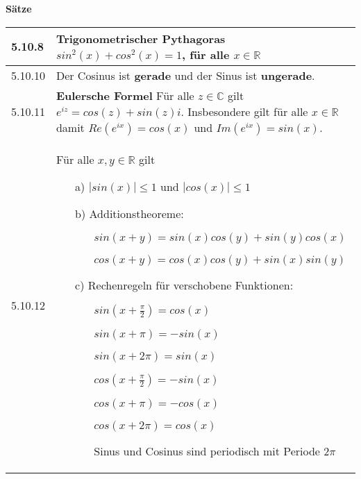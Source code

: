     \noindent 
    \textbf{Sätze}
    \begin{table}[H]
    \begin{tabularx}{\textwidth}{X m{16cm}}
        \toprule

        5.10.8& \textbf{Trigonometrischer Pythagoras}\hfill \break
                $sin^2(x) + cos^2(x) = 1$, für alle $x \in \mathbb{R}$ \\
        \midrule
        5.10.10&Der Cosinus ist \textbf{gerade} und der Sinus ist \textbf{ungerade}. \\
        \midrule
        5.10.11&\textbf{Eulersche Formel} \hfill \break
                Für alle $z \in \mathbb{C}$ gilt $e^{iz} = cos(z)+sin(z)i$. \hfill \break
                Insbesondere gilt für alle $x \in \mathbb{R}$ damit $Re(e^{ix}) = cos(x)$ und $Im(e^{ix})=sin(x)$. \\
        \midrule
        5.10.12&Für alle $x,y \in \mathbb{R}$ gilt 
                \begin{itemize}
                    \item[a)] $|sin(x)| \leq 1$ und $|cos(x)| \leq 1$
                    \item[b)] Additionstheoreme:
                                \begin{itemize}
                                    \item[] $sin(x+y) = sin(x)cos(y)+sin(y)cos(x)$
                                    \item[] $cos(x+y) = cos(x)cos(y)+sin(x)sin(y)$ 
                                \end{itemize}
                    \item[c)] Rechenregeln für verschobene Funktionen:
                                \begin{itemize}
                                    \item[] $sin(x + \frac{\pi}{2}) = cos(x)$
                                    \item[] $sin(x + \pi) = -sin(x)$
                                    \item[] $sin(x+2\pi) = sin(x)$
                                    \item[] $cos(x + \frac{\pi}{2}) = -sin(x)$
                                    \item[] $cos(x+\pi) = -cos(x)$
                                    \item[] $cos(x+2\pi) = cos(x)$
                                    \item[] Sinus und Cosinus sind periodisch mit Periode $2\pi$      

\end{itemize}
\end{itemize}
\end{tabularx}
\end{table}
